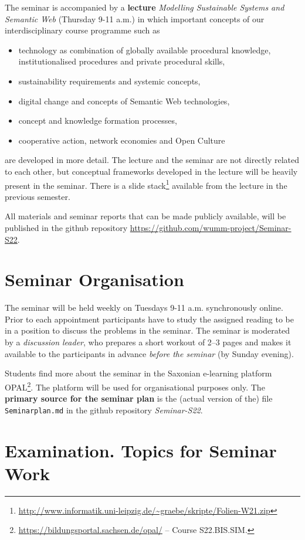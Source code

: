 \documentclass[11pt,a4paper]{article}
\begin{document}
The seminar is accompanied by a \textbf{lecture} \emph{Modelling Sustainable
  Systems and Semantic Web} (Thursday 9-11 a.m.) in which important concepts
of our interdisciplinary course programme such as
\begin{itemize}[noitemsep]
\item technology as combination of globally available procedural knowledge,
  institutionalised procedures and private procedural skills, 
\item sustainability requirements and systemic concepts,
\item digital change and concepts of Semantic Web technologies,
\item concept and knowledge formation processes,
\item cooperative action, network economies and Open Culture
\end{itemize}
are developed in more detail. The lecture and the seminar are not directly
related to each other, but conceptual frameworks developed in the lecture will
be heavily present in the seminar. There is a slide
stack\footnote{\url{http://www.informatik.uni-leipzig.de/~graebe/skripte/Folien-W21.zip}}
available from the lecture in the previous semester.

All materials and seminar reports that can be made publicly available, will be
published in the github repository
\url{https://github.com/wumm-project/Seminar-S22}.

\section{Seminar Organisation}

The seminar will be held weekly on Tuesdays 9-11 a.m.  synchronously online.
Prior to each appointment participants have to study the assigned reading to
be in a position to discuss the problems in the seminar.  The seminar is
moderated by a \emph{discussion leader}, who prepares a short workout of 2--3
pages and makes it available to the participants in advance \emph{before the
  seminar} (by Sunday evening).

Students find more about the seminar in the Saxonian e-learning platform
OPAL\footnote{\url{https://bildungsportal.sachsen.de/opal/} -- Course
  S22.BIS.SIM.}.  The platform will be used for organisational purposes only.
The \textbf{primary source for the seminar plan} is the (actual version of
the) file \texttt{Seminarplan.md} in the github repository \emph{Seminar-S22}.

\section{Examination. Topics for Seminar Work}
\end{document}

